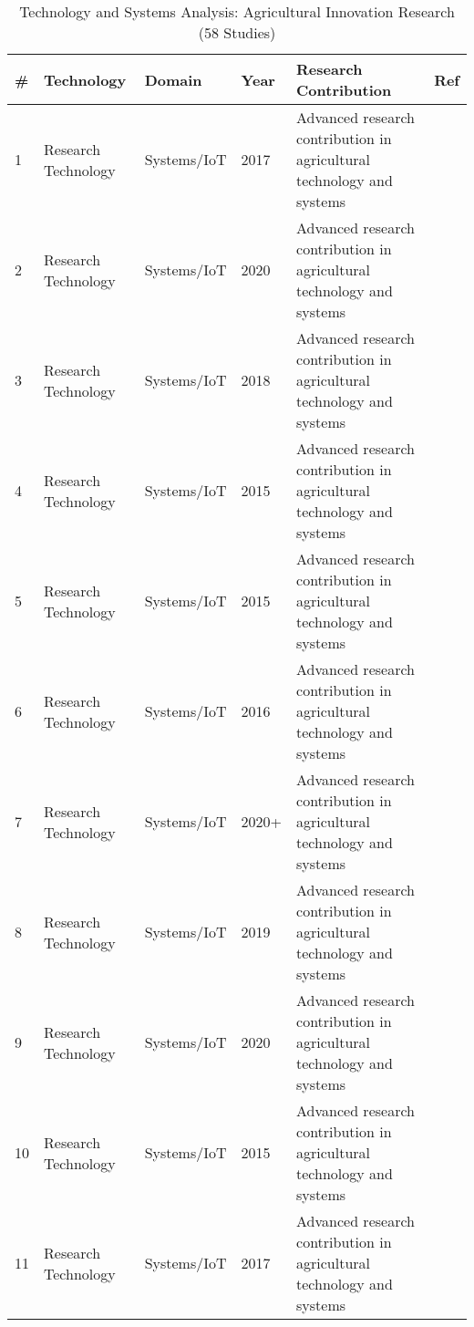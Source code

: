 \begin{table*}[htbp]
\centering
\tiny
\caption{Technology and Systems Analysis: Agricultural Innovation Research (58 Studies)}
\label{tab:figure10_technology_systems}
\begin{tabular}{p{}p{}p{}p{}p{}p{}}
\toprule
\textbf{\#} & \textbf{Technology} & \textbf{Domain} & \textbf{Year} & \textbf{Research Contribution} & \textbf{Ref} \\ \midrule
  1 & Research Technology & Systems/IoT & 2017 & Advanced research contribution in agricultural technology and systems & \cite{rahnemoonfar2017deep} \\
  2 & Research Technology & Systems/IoT & 2020 & Advanced research contribution in agricultural technology and systems & \cite{rayhana2020internet} \\
  3 & Research Technology & Systems/IoT & 2018 & Advanced research contribution in agricultural technology and systems & \cite{redmon2018yolov3} \\
  4 & Research Technology & Systems/IoT & 2015 & Advanced research contribution in agricultural technology and systems & \cite{ren2015faster} \\
  5 & Research Technology & Systems/IoT & 2015 & Advanced research contribution in agricultural technology and systems & \cite{ronneberger2015u} \\
  6 & Research Technology & Systems/IoT & 2016 & Advanced research contribution in agricultural technology and systems & \cite{sa2016deepfruits} \\
  7 & Research Technology & Systems/IoT & 2020+ & Advanced research contribution in agricultural technology and systems & \cite{sadeghian2025reliability} \\
  8 & Research Technology & Systems/IoT & 2019 & Advanced research contribution in agricultural technology and systems & \cite{samtani2019status} \\
  9 & Research Technology & Systems/IoT & 2020 & Advanced research contribution in agricultural technology and systems & \cite{sepulveda2020robotic} \\
 10 & Research Technology & Systems/IoT & 2015 & Advanced research contribution in agricultural technology and systems & \cite{si2015location} \\
 11 & Research Technology & Systems/IoT & 2017 & Advanced research contribution in agricultural technology and systems & \cite{silwal2017design} \\

\end{tabular}
\end{table*}
